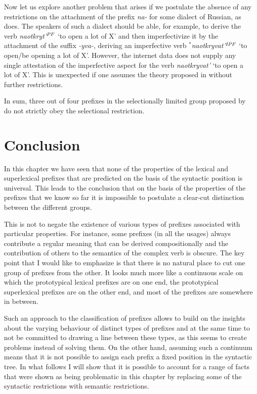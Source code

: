 Now let us explore another problem that arises if we postulate the absence of any restrictions on the attachment of the prefix \textit{na-} for some dialect of Russian, as \citet{Tatevosov:13a} does. The speakers of such a dialect should be able, for example, to derive the verb \textit{naotkryt'}$^{\mathit{PF}}$ `to open a lot of X' and then imperfectivize it by the attachment of the suffix \textit{-yva-}, deriving an imperfective verb $^*$\textit{naotkryvat'}$^{\mathit{IPF}}$ `to open/be opening a lot of X'. However, the internet data does not supply any single attestation of the imperfective aspect for the verb \textit{naotkryvat'} `to open a lot of X'. This is unexpected if one assumes the theory proposed in \citet{Tatevosov:13a} without further restrictions.

In sum, three out of four prefixes in the selectionally limited group proposed by \citet{Tatevosov:09} do not strictly obey the selectional restriction. 

\section{Conclusion}\label{section:new:conclusion}
In this chapter we have seen that none of the properties of the lexical and superlexical prefixes that are predicted on the basis of the syntactic position is universal. This leads to the conclusion that on the basis of the properties of the prefixes that we know so far it is impossible to postulate a clear-cut distinction between the different groups. 

This is not to negate the existence of various types of prefixes associated with particular properties. For instance, some prefixes (in all the usages) always contribute a regular meaning that can be derived compositionally and the contribution of others to the semantics of the complex verb is obscure. The key point that I would like to emphasize is that there is no natural place to cut one group of prefixes from the other. It looks much more like a continuous scale on which the prototypical lexical prefixes are on one end, the prototypical superlexical prefixes are on the other end, and most of the prefixes are somewhere in between. 

Such an approach to the classification of prefixes allows to build on the insights about the varying behaviour of distinct types of prefixes and at the same time to not be committed to drawing a line between these types, as this seems to create problems instead of solving them. On the other hand, assuming such a continuum means that it is not possible to assign each prefix a fixed position in the syntactic tree. In what follows I will show that it is possible to account for a range of facts that were shown as being problematic in this chapter by replacing some of the syntactic restrictions with semantic restrictions.
